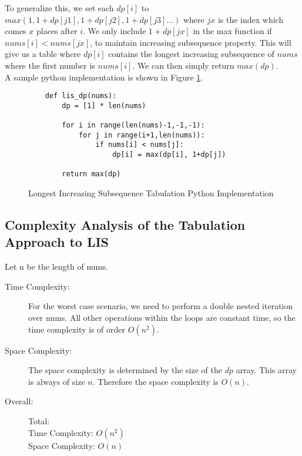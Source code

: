 To generalize this, we set each $dp[i]$ to $max(1,1+dp[j1],1+dp[j2],1+dp[j3]...)$ where $jx$ is the index which comes $x$ places after $i$.
We only include $1+dp[jx]$ in the max function if $nums[i] < nums[jx]$, to maintain increasing subsequence property.
This will give us a table where $dp[i]$ contains the longest increasing subsequence of $nums$ where the first number is $nums[i]$.
We can then simply return $max(dp)$.\\

A sample python implementation is shown in Figure \ref{fig:lis-dp}.

\begin{figure}[H]
    \centering
    \begin{lstlisting}
    def lis_dp(nums):
        dp = [1] * len(nums)
    
        for i in range(len(nums)-1,-1,-1):
            for j in range(i+1,len(nums)):
                if nums[i] < nums[j]:
                    dp[i] = max(dp[i], 1+dp[j])
    
        return max(dp)
    \end{lstlisting}
    \caption{Longest Increasing Subsequence Tabulation Python Implementation}
    \label{fig:lis-dp}
\end{figure}

\subsection{Complexity Analysis of the Tabulation Approach to LIS}
Let n be the length of nums.
\begin{description}
    \item[Time Complexity:]
        For the worst case scenario, we need to perform a double nested iteration over nums.
        All other operations within the loops are constant time, so the time complexity is of order $O(n^2)$.
        
    \item[Space Complexity:] 
        The space complexity is determined by the size of the $dp$ array. This array is always of size $n$.
        Therefore the space complexity is $O(n)$.
        
        
    \item[Overall:] Total:\\
        Time Complexity: $O(n^2)$\\
        Space Complexity: $O(n)$
    
\end{description}
